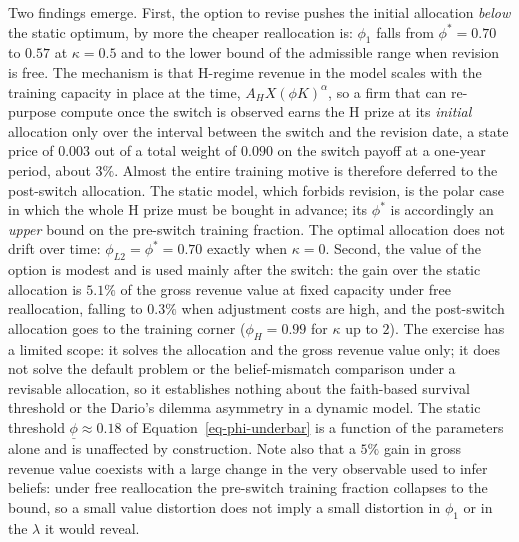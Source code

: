 \documentclass[
  11pt,
  letterpaper,
]{scrartcl}
\begin{document}
Two findings emerge. First, the option to revise pushes the initial
allocation \emph{below} the static optimum, by more the cheaper
reallocation is: \(\phi_1\) falls from \(\phi^* = 0.70\) to \(0.57\) at
\(\kappa = 0.5\) and to the lower bound of the admissible range when
revision is free. The mechanism is that H-regime revenue in the model
scales with the training capacity in place at the time,
\(A_H X (\phi K)^\alpha\), so a firm that can re-purpose compute once
the switch is observed earns the H prize at its \emph{initial}
allocation only over the interval between the switch and the revision
date, a state price of \(0.003\) out of a total weight of \(0.090\) on
the switch payoff at a one-year period, about \(3\%\). Almost the entire
training motive is therefore deferred to the post-switch allocation. The
static model, which forbids revision, is the polar case in which the
whole H prize must be bought in advance; its \(\phi^*\) is accordingly
an \emph{upper} bound on the pre-switch training fraction. The optimal
allocation does not drift over time: \(\phi_{L2} = \phi^* = 0.70\)
exactly when \(\kappa = 0\). Second, the value of the option is modest
and is used mainly after the switch: the gain over the static allocation
is \(5.1\%\) of the gross revenue value at fixed capacity under free
reallocation, falling to \(0.3\%\) when adjustment costs are high, and
the post-switch allocation goes to the training corner
(\(\phi_H = 0.99\) for \(\kappa\) up to \(2\)). The exercise has a
limited scope: it solves the allocation and the gross revenue value
only; it does not solve the default problem or the belief-mismatch
comparison under a revisable allocation, so it establishes nothing about
the faith-based survival threshold or the Dario's dilemma asymmetry in a
dynamic model. The static threshold \(\underline{\phi} \approx 0.18\) of
Equation~\ref{eq-phi-underbar} is a function of the parameters alone and
is unaffected by construction. Note also that a \(5\%\) gain in gross
revenue value coexists with a large change in the very observable used
to infer beliefs: under free reallocation the pre-switch training
fraction collapses to the bound, so a small value distortion does not
imply a small distortion in \(\phi_1\) or in the \(\lambda\) it would
reveal.
\end{document}
